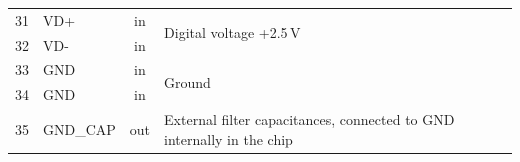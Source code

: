 \begin{table}[h]
\begin{center}
{\begin{tabular}{clcl}
	\midrule %
	31 & VD+             & in  & \multirow{2}{*}{Digital voltage +2.5\,V} \\
	32 & VD-             & in  & \\
	\midrule %
	33 & GND             & in  & \multirow{2}{*}{Ground}\\
	34 & GND             & in  & \\
	\midrule %
	35 & GND\_CAP        & out & External filter capacitances, connected to GND internally in the chip \\
	\bottomrule %
	\end{tabular}
	}
    \end{center}
\end{table}


